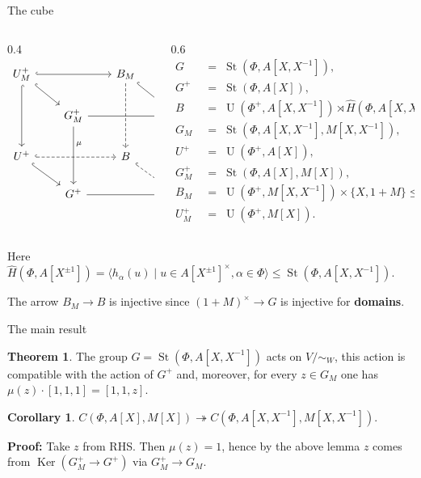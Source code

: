 \documentclass[handout]{beamer} %
\DeclareMathOperator{\St}{St}
\DeclareMathOperator{\Ker}{Ker}
\newcommand{\StH}{\widehat{H}}
\DeclareMathOperator{\UU}{U}
\theoremstyle{definition}
\newtheorem*{thm}{Theorem}
\newtheorem*{cor}{Corollary}
\begin{document}
\begin{frame}[fragile]{The cube}

\begin{columns}[T]
\begin{column}{0.4\textwidth}
\raggedleft
\scriptsize
\hspace*{0pt}%
\[
\begin{tikzcd}[row sep=1.8em, column sep=2.1em]
U^+_M
  \arrow[rr, hook]
  \arrow[dd, hook]
  \arrow[rd, hook]
&&
B_M
  \arrow[dd, dashed]
  \arrow[rd, hook]
& \\
&
G_M^+
  \arrow[rr]
  \arrow[dd, "\mu", pos=0.3]
&&
G_M
  \arrow[dd, "\mu"]
\\
U^+
  \arrow[rr, hook, dashed]
  \arrow[rd, hook]
&&
B
  \arrow[rd, hook, dashed]
& \\
&
G^+
  \arrow[rr]
&&
G
\end{tikzcd}
\]
\end{column}

\begin{column}{0.6\textwidth}
\raggedleft
\scriptsize
\[
\begin{aligned}
G \;&=\; \St(\Phi, A[X,X^{-1}]),\\
G^+ \;&=\; \St(\Phi, A[X]),\\
B \;&=\; \UU(\Phi^+, A[X,X^{-1}])
       \rtimes \StH(\Phi, A[X,X^{-1}]) \le G,\\
G_M \;&=\; \St(\Phi, A[X,X^{-1}], M[X,X^{-1}]),\\
U^+ \;&=\; \UU(\Phi^+, A[X]),\\
G_M^+ \;&=\; \St(\Phi, A[X], M[X]),\\
B_M \;&=\; \UU(\Phi^+, M[X,X^{-1}]) \times \{X,1+M\} \le G_M,\\
U_M^+ \;&=\; \UU(\Phi^+, M[X]).
\end{aligned}
\]
\end{column}
\end{columns}
\medbreak

\scriptsize { Here $\StH(\Phi, A[X^{\pm 1}]) = \langle h_\alpha(u) \mid u \in A[X^{\pm 1}]^\times, \alpha \in \Phi \rangle \leq \St(\Phi, A[X, X^{-1}])$. }
\pause

\scriptsize { The arrow $B_M \to B$ is injective since $(1 + M)^\times \to G$ is injective for \textbf{domains}. }
\end{frame}

\begin{frame}{The main result}
\begin{thm}
 The group $G = \St(\Phi, A[X, X^{-1}])$ acts on $V/\sim_W$, this action is compatible with the action of $G^+$ and, moreover, for every $z \in G_M$ one has $\mu(z) \cdot [1, 1, 1] = [1, 1, z]$.
\end{thm}
\pause

\begin{cor}
 $C(\Phi, A[X], M[X]) \twoheadrightarrow C(\Phi, A[X, X^{-1}], M[X, X^{-1}])$.
\end{cor}
\pause
\textbf{Proof:} Take $z$ from RHS. Then $\mu(z) = 1$, hence by the above lemma $z$ comes from $\Ker(G_M^+ \to G^+)$ via $G_M^+ \to G_M$.
\end{frame}
\end{document}

